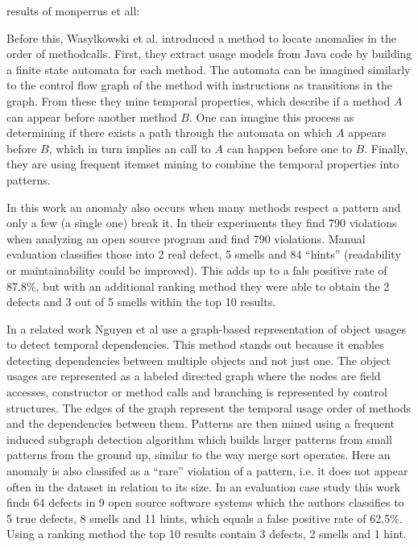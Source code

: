results of monperrus et all:

Before this, Wasylkowski et al. \cite{wasylkowski2007detecting} introduced a method to locate anomalies in the order of methodcalls.
First, they extract usage models from Java code by building a finite state automata for each method.
The automata can be imagined similarly to the control flow graph of the method with instructions as transitions in the graph.
From these they mine temporal properties, which describe if a method $A$ can appear before another method $B$.
One can imagine this process as determining if there exists a path through the automata on which $A$ appears before $B$, which in turn implies an call to $A$ can happen before one to $B$.
Finally, they are using frequent itemset mining \cite{han2006data} to combine the temporal properties into patterns.

In this work an anomaly also occurs when many methods respect a pattern and only a few (a single one) break it.
In their experiments they find 790 violations when analyzing an open source program and find 790 violations.
Manual evaluation classifies those into 2 real defect, 5 smells and 84 ``hints'' (readability or maintainability could be improved).
This adds up to a fals positive rate of 87.8\%, but with an additional ranking method they were able to obtain the 2 defects and 3 out of 5 smells within the top 10 results.

In a related work Nguyen et al \cite{nguyen2009graph} use a graph-based representation of object usages to detect temporal dependencies.
This method stands out because it enables detecting dependencies between multiple objects and not just one.
The object usages are represented as a labeled directed graph where the nodes are field accesses, constructor or method calls and branching is represented by control structures.
The edges of the graph represent the temporal usage order of methods and the dependencies between them.
Patterns are then mined using a frequent induced subgraph detection algorithm which builds larger patterns from small patterns from the ground up, similar to the way merge sort operates.
Here an anomaly is also classifed as a ``rare'' violation of a pattern, i.e. it does not appear often in the dataset in relation to its size.
In an evaluation case study this work finds 64 defects in 9 open source software systems which the authors classifies to 5 true defects, 8 smells and 11 hints, which equals a false positive rate of 62.5\%.
Using a ranking method the top 10 results contain 3 defects, 2 smells and 1 hint.



